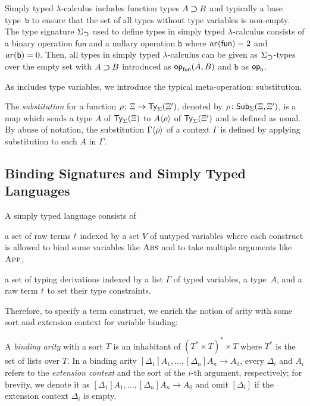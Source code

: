 \begin{example} \label{ex:type-signature-for-function-type}
  Simply typed $\lambda$-calculus includes function types $A \mathbin{\bm{\supset}} B$ and typically a base type~$\mathtt{b}$ to ensure that the set of all types without type variables is non-empty.
  The type signature $\Sigma_{\mathbin{\bm{\supset}}}$ used to define types in simply typed $\lambda$-calculus consists of a binary operation $\mathsf{fun}$ and a nullary operation $\mathsf{b}$ where $\mathit{ar}(\mathsf{fun}) = 2$ and $\mathit{ar}(\mathsf{b}) = 0$.
  Then, all types in simply typed $\lambda$-calculus can be given as $\Sigma_{\mathbin{\bm{\supset}}}$-types over the empty set with $A \mathbin{\bm{\supset}} B$ introduced as $\mathsf{op}_{\mathsf{fun}}(A, B)$ and $\mathtt{b}$ as $\mathsf{op}_{\mathsf{b}}$. 
\end{example}

As  includes type variables, we introduce the typical meta-operation: substitution.
\begin{definition}
  The \emph{substitution} for a function $\rho\colon \Xi \to \mathsf{Ty}_{\Sigma}(\Xi')$, denoted by $\rho\colon \mathsf{Sub}_{\Sigma}(\Xi,\Xi')$, is a map which sends a type $A$ of $\mathsf{Ty}_{\Sigma}(\Xi)$ to ${A}\!\left<{\rho}\right>$ of $\mathsf{Ty}_{\Sigma}(\Xi')$ and is defined as usual.
  By abuse of notation, the substitution ${\Gamma}\!\left<{\rho}\right>$ of a context $\Gamma$ is defined by applying substitution to each $A$ in $\Gamma$.
\end{definition}

\subsection{Binding Signatures and Simply Typed Languages} \label{subsec:binding-sig}

A simply typed language consists of
\begin{enumerate*}
  \item a set of raw terms $\isTerm{t}$ indexed by a set $V$ of untyped variables where each construct is allowed to bind some variables like $\textnormal{\textsc{Abs}}$ and to take multiple arguments like $\textnormal{\textsc{App}}$;
  \item a set of typing derivations indexed by a list $\Gamma$ of typed variables, a type~$A$, and a raw term $\isTerm{t}$ to set their type constraints. 
\end{enumerate*}
Therefore, to specify a term construct, we enrich the notion of arity with some sort and extension context for variable binding:
\begin{definition}\label{def:binding-arity}
  A \emph{binding arity} with a sort $T$ is an inhabitant of $\left(T^* \times T\right)^* \times T$ where $T^*$ is the set of lists over $T$.
  In a binding arity ${[\Delta_1]A_{1}, \ldots, \left[\Delta_{n}\right] A_{n}} \to {A_0}$, every $\Delta_i$ and $A_i$ refers to the \emph{extension context} and the sort of the $i$-th argument, respectively; for brevity, we denote it as ${[\Delta_1]A_{1}, \ldots, \left[\Delta_{n}\right] A_{n}} \to {A_0}$ and omit $[\Delta_i]$ if the extension context $\Delta_i$ is empty.
\end{definition}

